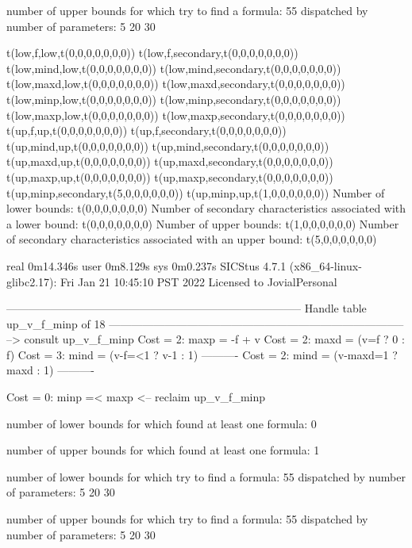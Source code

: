 number of upper bounds for which try to find a formula: 55
dispatched by number of parameters: 5  20  30

t(low,f,low,t(0,0,0,0,0,0,0))
t(low,f,secondary,t(0,0,0,0,0,0,0))
t(low,mind,low,t(0,0,0,0,0,0,0))
t(low,mind,secondary,t(0,0,0,0,0,0,0))
t(low,maxd,low,t(0,0,0,0,0,0,0))
t(low,maxd,secondary,t(0,0,0,0,0,0,0))
t(low,minp,low,t(0,0,0,0,0,0,0))
t(low,minp,secondary,t(0,0,0,0,0,0,0))
t(low,maxp,low,t(0,0,0,0,0,0,0))
t(low,maxp,secondary,t(0,0,0,0,0,0,0))
t(up,f,up,t(0,0,0,0,0,0,0))
t(up,f,secondary,t(0,0,0,0,0,0,0))
t(up,mind,up,t(0,0,0,0,0,0,0))
t(up,mind,secondary,t(0,0,0,0,0,0,0))
t(up,maxd,up,t(0,0,0,0,0,0,0))
t(up,maxd,secondary,t(0,0,0,0,0,0,0))
t(up,maxp,up,t(0,0,0,0,0,0,0))
t(up,maxp,secondary,t(0,0,0,0,0,0,0))
t(up,minp,secondary,t(5,0,0,0,0,0,0))
t(up,minp,up,t(1,0,0,0,0,0,0))
Number of lower bounds:                                             t(0,0,0,0,0,0,0)
Number of secondary characteristics associated with a lower bound:  t(0,0,0,0,0,0,0)
Number of upper bounds:                                             t(1,0,0,0,0,0,0)
Number of secondary characteristics associated with an upper bound: t(5,0,0,0,0,0,0)

real	0m14.346s
user	0m8.129s
sys	0m0.237s
SICStus 4.7.1 (x86_64-linux-glibc2.17): Fri Jan 21 10:45:10 PST 2022
Licensed to JovialPersonal


--------------------------------------------------------------------------------
Handle table up_v_f_minp of 18
--------------------------------------------------------------------------------
--> consult up_v_f_minp
Cost =  2:  maxp = -f + v
Cost =  2:  maxd = (v=f ? 0 : f)
Cost =  3:  mind = (v-f=<1 ? v-1 : 1)
----------
Cost =  2:  mind = (v-maxd=1 ? maxd : 1)
----------

Cost =  0:  minp =< maxp
<-- reclaim up_v_f_minp

number of lower bounds for which found at least one formula: 0

number of upper bounds for which found at least one formula: 1

number of lower bounds for which try to find a formula: 55
dispatched by number of parameters: 5  20  30

number of upper bounds for which try to find a formula: 55
dispatched by number of parameters: 5  20  30


